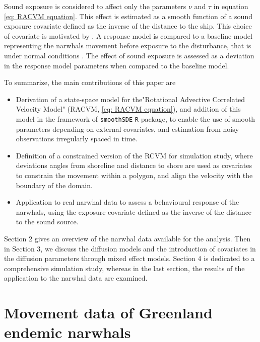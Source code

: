 \documentclass[11pt]{article}
\newcommand {\1}{\mathbb{1}}
\begin{document}
Sound exposure is considered to affect only the parameters $\nu$ and $\tau$ in equation \ref{eq: RACVM equation}. This effect is estimated as a smooth function of a sound exposure covariate defined as the inverse of the distance to the ship. This choice of covariate is motivated by \cite{heide-jorgensen_behavioral_2021}. A response model is compared to a baseline model representing the narwhals movement before exposure to the disturbance, that is under normal conditions \cite{michelot_continuous-time_2022}.
The effect of sound exposure is assessed as a deviation in the response model parameters when compared to the baseline model.



To summarize, the main contributions of this paper are
\begin{itemize}
	\item Derivation of a state-space model for the"Rotational Advective Correlated Velocity Model" (RACVM, \ref{eq: RACVM equation}), and addition of this model in the framework of \texttt{smoothSDE} \texttt{R} package, to enable the use of smooth parameters depending on external covariates, and estimation from noisy observations irregularly spaced in time.
	\item Definition of a constrained version of the RCVM for simulation study, where deviations angles from shoreline and distance to shore are used as covariates to constrain the movement within a polygon, and align the velocity with the boundary of the domain.
	\item Application to real narwhal data to assess a behavioural response of the narwhals, using the exposure covariate defined as the inverse of the distance to the sound source.
\end{itemize}

Section 2 gives an overview of the narwhal data available for the analysis. Then in Section 3, we discuss the diffusion models and the introduction of covariates in the diffusion parameters through mixed effect models. Section 4 is dedicated to a comprehensive simulation study, whereas in the last section, the results of the application to the narwhal data are examined.

\section{Movement data of Greenland endemic narwhals}
\end{document}
